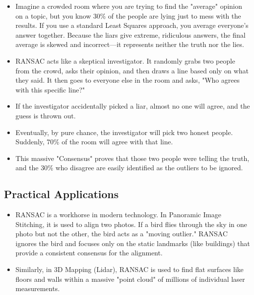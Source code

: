 \documentclass[12pt]{article}
\begin{document}
\begin{itemize}
    \item Imagine a crowded room where you are trying to find the "average" opinion on a topic, but you know 30\% of the people are lying just to mess with the results. If you use a standard Least Squares approach, you average everyone’s answer together. Because the liars give extreme, ridiculous answers, the final average is skewed and incorrect—it represents neither the truth nor the lies.

    \item RANSAC acts like a skeptical investigator. It randomly grabs two people from the crowd, asks their opinion, and then draws a line based only on what they said. It then goes to everyone else in the room and asks, "Who agrees with this specific line?"

    \item If the investigator accidentally picked a liar, almost no one will agree, and the guess is thrown out.

    \item Eventually, by pure chance, the investigator will pick two honest people. Suddenly, 70\% of the room will agree with that line.

    \item This massive "Consensus" proves that those two people were telling the truth, and the 30\% who disagree are easily identified as the outliers to be ignored.
\end{itemize}


\subsection{Practical Applications}

\begin{itemize}
    \item RANSAC is a workhorse in modern technology. In Panoramic Image Stitching, it is used to align two photos. If a bird flies through the sky in one photo but not the other, the bird acts as a "moving outlier." RANSAC ignores the bird and focuses only on the static landmarks (like buildings) that provide a consistent consensus for the alignment.

    \item Similarly, in 3D Mapping (Lidar), RANSAC is used to find flat surfaces like floors and walls within a massive "point cloud" of millions of individual laser measurements.
\end{itemize}
\end{document}
